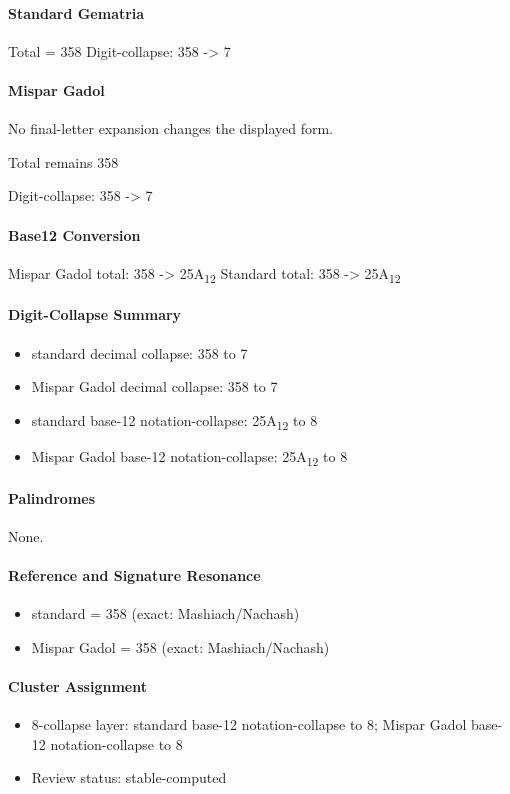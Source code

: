 \paragraph{Standard Gematria}
Total = 358
Digit-collapse: 358 -> 7
\paragraph{Mispar Gadol}
No final-letter expansion changes the displayed form.

Total remains 358

Digit-collapse: 358 -> 7
\paragraph{Base12 Conversion}
Mispar Gadol total: 358 -> 25A\textsubscript{12}
Standard total: 358 -> 25A\textsubscript{12}
\paragraph{Digit-Collapse Summary}
\begin{itemize}
\item standard decimal collapse: 358 to 7
\item Mispar Gadol decimal collapse: 358 to 7
\item standard base-12 notation-collapse: 25A\textsubscript{12} to 8
\item Mispar Gadol base-12 notation-collapse: 25A\textsubscript{12} to 8
\end{itemize}
\paragraph{Palindromes}
None.
\paragraph{Reference and Signature Resonance}
\begin{itemize}
\item standard = 358 (exact: Mashiach/Nachash)
\item Mispar Gadol = 358 (exact: Mashiach/Nachash)
\end{itemize}
\paragraph{Cluster Assignment}
\begin{itemize}
\item 8-collapse layer: standard base-12 notation-collapse to 8; Mispar Gadol base-12 notation-collapse to 8
\item Review status: stable-computed
\end{itemize}
